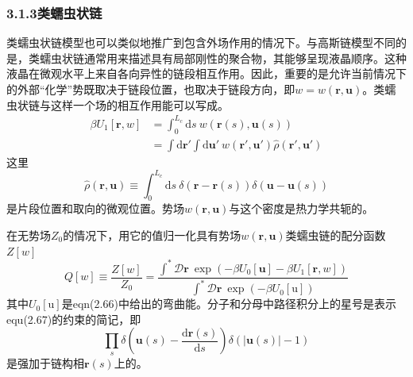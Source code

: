 \subsubsection{3.1.3类蠕虫状链}
类蠕虫状链模型也可以类似地推广到包含外场作用的情况下。与高斯链模型不同的是，类蠕虫状链通常用来描述具有局部刚性的聚合物，其能够呈现液晶顺序。这种液晶在微观水平上来自各向异性的链段相互作用。因此，重要的是允许当前情况下的外部“化学”势既取决于链段位置，也取决于链段方向，即$w=w(\mathbf{r},\mathbf{u})$。类蠕虫状链与这样一个场的相互作用能可以写成。
\begin{equation}
\begin{aligned}
\beta U_1[\mathbf{r},w]&=\int_0^{L_c}\mathrm{d}s~w(\mathbf{r}(s),\mathbf{u}(s))\\
&=\int\mathrm{d}\mathbf{r}'\int\mathrm{d}\mathbf{u}'~w(\mathbf{r}',\mathbf{u}')\hat{\rho}(\mathbf{r}',\mathbf{u}')
\end{aligned}
\end{equation}
这里
\begin{equation}
\hat{\rho}(\mathbf{r},\mathbf{u})\equiv\int_0^{L_c}\mathrm{d}s~\delta(\mathbf{r}-\mathbf{r}(s))\delta(\mathbf{u}-\mathbf{u}(s))
\end{equation}
是片段位置和取向的微观位置。势场$w(\mathbf{r},\mathbf{u})$与这个密度是热力学共轭的。

在无势场$Z_0$的情况下，用它的值归一化具有势场$w(\mathbf{r},\mathbf{u})$类蠕虫链的配分函数$Z[w]$
\begin{equation}
Q[w]\equiv\frac{Z[w]}{Z_0}=\frac{\int^*\mathcal{D}\mathbf{r}~\exp(-\beta U_0[\mathbf{u}]-\beta U_1[\mathbf{r},w])}{\int^*\mathcal{D}\mathbf{r}~\exp(-\beta U_0[\mathrm{u}])}
\end{equation}
其中$U_0[\mathrm{u}]$是eqn(2.66)中给出的弯曲能。分子和分母中路径积分上的星号是表示equ(2.67)的约束的简记，即
\begin{equation}
\prod\limits_s\delta\left(\mathbf{u}(s)-\frac{\mathrm{d}\mathbf{r}(s)}{\mathrm{d}s}\right)\delta(\left|\mathbf{u}(s)\right|-1)
\end{equation}
是强加于链构相$\mathbf{r}(s)$上的。

